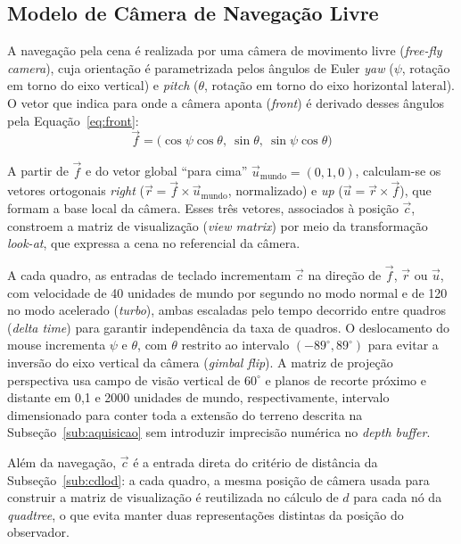 \documentclass[conference]{IEEEtran}
\begin{document}
\subsection{Modelo de Câmera de Navegação Livre}
\label{sub:camera}

A navegação pela cena é realizada por uma câmera de movimento livre
(\emph{free-fly camera}), cuja orientação é parametrizada pelos ângulos de
Euler \emph{yaw} ($\psi$, rotação em torno do eixo vertical) e \emph{pitch}
($\theta$, rotação em torno do eixo horizontal lateral). O vetor que indica
para onde a câmera aponta (\emph{front}) é derivado desses ângulos pela
Equação~\eqref{eq:front}:
\begin{equation}
\vec{f} = \big(\cos\psi\cos\theta,\ \sin\theta,\ \sin\psi\cos\theta\big)
\label{eq:front}
\end{equation}

A partir de $\vec{f}$ e do vetor global ``para cima''
$\vec{u}_{\text{mundo}} = (0,1,0)$, calculam-se os vetores ortogonais
\emph{right} ($\vec{r} = \vec{f} \times \vec{u}_{\text{mundo}}$,
normalizado) e \emph{up} ($\vec{u} = \vec{r} \times \vec{f}$), que formam a
base local da câmera. Esses três vetores, associados à posição $\vec{c}$,
constroem a matriz de visualização (\emph{view matrix}) por meio da
transformação \emph{look-at}, que expressa a cena no referencial da câmera.

A cada quadro, as entradas de teclado incrementam $\vec{c}$ na direção de
$\vec{f}$, $\vec{r}$ ou $\vec{u}$, com velocidade de 40 unidades de mundo
por segundo no modo normal e de 120 no modo acelerado (\emph{turbo}), ambas
escaladas pelo tempo decorrido entre quadros (\emph{delta time}) para
garantir independência da taxa de quadros. O deslocamento do mouse
incrementa $\psi$ e $\theta$, com $\theta$ restrito ao intervalo
$(-89^{\circ}, 89^{\circ})$ para evitar a inversão do eixo vertical da
câmera (\emph{gimbal flip}). A matriz de projeção perspectiva usa campo de
visão vertical de $60^{\circ}$ e planos de recorte próximo e distante em 0,1
e 2000 unidades de mundo, respectivamente, intervalo dimensionado para conter
toda a extensão do terreno descrita na Subseção~\ref{sub:aquisicao} sem
introduzir imprecisão numérica no \emph{depth buffer}.

Além da navegação, $\vec{c}$ é a entrada direta do critério de distância da
Subseção~\ref{sub:cdlod}: a cada quadro, a mesma posição de câmera usada
para construir a matriz de visualização é reutilizada no cálculo de $d$ para
cada nó da \emph{quadtree}, o que evita manter duas representações
distintas da posição do observador.
\end{document}
